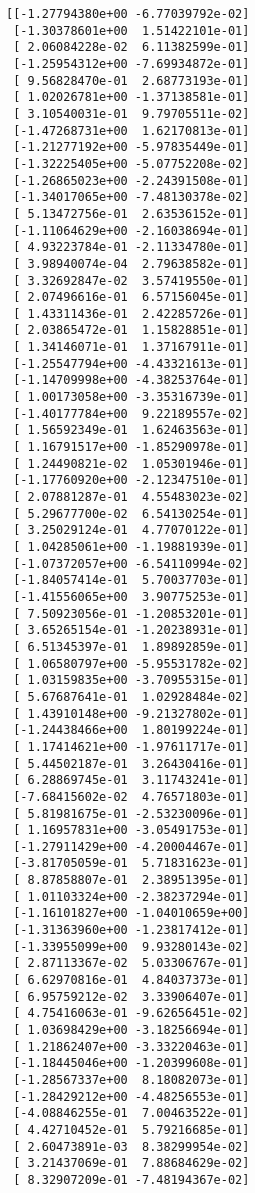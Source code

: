 \documentclass[11pt]{article}
\begin{document}
    \begin{Verbatim}[commandchars=\\\{\}]
[[-1.27794380e+00 -6.77039792e-02]
 [-1.30378601e+00  1.51422101e-01]
 [ 2.06084228e-02  6.11382599e-01]
 [-1.25954312e+00 -7.69934872e-01]
 [ 9.56828470e-01  2.68773193e-01]
 [ 1.02026781e+00 -1.37138581e-01]
 [ 3.10540031e-01  9.79705511e-02]
 [-1.47268731e+00  1.62170813e-01]
 [-1.21277192e+00 -5.97835449e-01]
 [-1.32225405e+00 -5.07752208e-02]
 [-1.26865023e+00 -2.24391508e-01]
 [-1.34017065e+00 -7.48130378e-02]
 [ 5.13472756e-01  2.63536152e-01]
 [-1.11064629e+00 -2.16038694e-01]
 [ 4.93223784e-01 -2.11334780e-01]
 [ 3.98940074e-04  2.79638582e-01]
 [ 3.32692847e-02  3.57419550e-01]
 [ 2.07496616e-01  6.57156045e-01]
 [ 1.43311436e-01  2.42285726e-01]
 [ 2.03865472e-01  1.15828851e-01]
 [ 1.34146071e-01  1.37167911e-01]
 [-1.25547794e+00 -4.43321613e-01]
 [-1.14709998e+00 -4.38253764e-01]
 [ 1.00173058e+00 -3.35316739e-01]
 [-1.40177784e+00  9.22189557e-02]
 [ 1.56592349e-01  1.62463563e-01]
 [ 1.16791517e+00 -1.85290978e-01]
 [ 1.24490821e-02  1.05301946e-01]
 [-1.17760920e+00 -2.12347510e-01]
 [ 2.07881287e-01  4.55483023e-02]
 [ 5.29677700e-02  6.54130254e-01]
 [ 3.25029124e-01  4.77070122e-01]
 [ 1.04285061e+00 -1.19881939e-01]
 [-1.07372057e+00 -6.54110994e-02]
 [-1.84057414e-01  5.70037703e-01]
 [-1.41556065e+00  3.90775253e-01]
 [ 7.50923056e-01 -1.20853201e-01]
 [ 3.65265154e-01 -1.20238931e-01]
 [ 6.51345397e-01  1.89892859e-01]
 [ 1.06580797e+00 -5.95531782e-02]
 [ 1.03159835e+00 -3.70955315e-01]
 [ 5.67687641e-01  1.02928484e-02]
 [ 1.43910148e+00 -9.21327802e-01]
 [-1.24438466e+00  1.80199224e-01]
 [ 1.17414621e+00 -1.97611717e-01]
 [ 5.44502187e-01  3.26430416e-01]
 [ 6.28869745e-01  3.11743241e-01]
 [-7.68415602e-02  4.76571803e-01]
 [ 5.81981675e-01 -2.53230096e-01]
 [ 1.16957831e+00 -3.05491753e-01]
 [-1.27911429e+00 -4.20004467e-01]
 [-3.81705059e-01  5.71831623e-01]
 [ 8.87858807e-01  2.38951395e-01]
 [ 1.01103324e+00 -2.38237294e-01]
 [-1.16101827e+00 -1.04010659e+00]
 [-1.31363960e+00 -1.23817412e-01]
 [-1.33955099e+00  9.93280143e-02]
 [ 2.87113367e-02  5.03306767e-01]
 [ 6.62970816e-01  4.84037373e-01]
 [ 6.95759212e-02  3.33906407e-01]
 [ 4.75416063e-01 -9.62656451e-02]
 [ 1.03698429e+00 -3.18256694e-01]
 [ 1.21862407e+00 -3.33220463e-01]
 [-1.18445046e+00 -1.20399608e-01]
 [-1.28567337e+00  8.18082073e-01]
 [-1.28429212e+00 -4.48256553e-01]
 [-4.08846255e-01  7.00463522e-01]
 [ 4.42710452e-01  5.79216685e-01]
 [ 2.60473891e-03  8.38299954e-02]
 [ 3.21437069e-01  7.88684629e-02]
 [ 8.32907209e-01 -7.48194367e-02]

\end{Verbatim}
\end{document}
